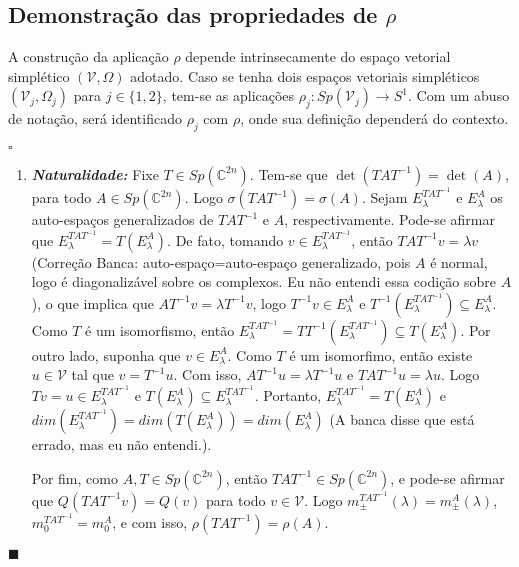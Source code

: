 \documentclass[12pt]{book}
\newenvironment{prova}[1]{$\square$ #1}{\hfill$\blacksquare$}
\newcommand{\autoespaco}[1]{E_{#1}}
\newcommand{\circulo}{S^{1}}
\newcommand{\complexificado}[1]{\mathcal{#1}}
\newcommand{\complexo}[1]{\mathbb{C}^{#1}}
\newcommand{\espectrooperador}[1]{\sigma(#1)}
\newcommand{\gruposimpletico}[1]{Sp(#1)}
\newcommand{\alerta}[1]{{\color{red}#1}}
\newcommand{\correcaobanca}[1]{\alerta{(Correção Banca: #1)}}
\begin{document}
	\subsection*{Demonstração das propriedades de $\rho$}
	
	A construção da aplicação $\rho$ depende intrinsecamente do espaço vetorial simplético $(\complexificado{V}, \Omega)$ adotado. Caso se tenha dois espaços vetoriais simpléticos $(\complexificado{V}_{j}, \Omega_{j})$ para $j\in \{1,2\}$, tem-se as aplicações $\rho_{j}:\gruposimpletico{\complexificado{V}_{j}} \to \circulo$. Com um abuso de notação, será identificado $\rho_{j}$ com $\rho$, onde sua definição dependerá do contexto.
	
	\begin{prova}
		
		\begin{enumerate}
			\item \textbf{\textit{Naturalidade:}} Fixe $T \in \gruposimpletico{\complexo{2n}}$.  Tem-se que $\det(TAT^{-1}) = \det(A)$, para todo $A \in \gruposimpletico{\complexo{2n}}$. Logo $\espectrooperador{TAT^{-1}} = \espectrooperador{A}$. Sejam $\autoespaco{\lambda}^{TAT^{-1}}$ e $\autoespaco{\lambda}^{A}$ os auto-espaços generalizados de $TAT^{-1}$ e $A$, respectivamente. Pode-se afirmar que $\autoespaco{\lambda}^{TAT^{-1}} = T(\autoespaco{\lambda}^{A})$. De fato, tomando $v \in \autoespaco{\lambda}^{TAT^{-1}}$, então $TAT^{-1}v = \lambda v$ \correcaobanca{auto-espaço=auto-espaço generalizado, pois $A$ é normal, logo é diagonalizável sobre os complexos. Eu não entendi essa codição sobre $A$}, o que implica que $AT^{-1}v = \lambda T^{-1}v$, logo $T^{-1}v \in \autoespaco{\lambda}^{A}$ e $T^{-1}(\autoespaco{\lambda}^{TAT^{-1}}) \subseteq \autoespaco{\lambda}^{A}$. \alerta{Como $T$ é um isomorfismo, então $\autoespaco{\lambda}^{TAT^{-1}} = TT^{-1}(\autoespaco{\lambda}^{TAT^{-1}}) \subseteq T(\autoespaco{\lambda}^{A})$. Por outro lado, suponha que $v\in \autoespaco{\lambda}^{A}$. Como $T$ é um isomorfimo, então existe $u \in \complexificado{V}$ tal que $v=T^{-1}u$. Com isso, $AT^{-1}u = \lambda T^{-1}u$ e $ TAT^{-1}u =\lambda u$. Logo $Tv=u \in \autoespaco{\lambda}^{TAT^{-1}}$ e $T(\autoespaco{\lambda}^{A}) \subseteq \autoespaco{\lambda}^{TAT^{-1}}$. Portanto, $\autoespaco{\lambda}^{TAT^{-1}}=T(\autoespaco{\lambda}^{A}) $ e $dim(\autoespaco{\lambda}^{TAT^{-1}})=dim(T(\autoespaco{\lambda}^{A}) )=dim(\autoespaco{\lambda}^{A})$ (A banca disse que está errado, mas eu não entendi.).} 
			
			Por fim, como $A,T\in \gruposimpletico{\complexo{2n}}$, então $TAT^{-1}\in \gruposimpletico{\complexo{2n}}$, e pode-se afirmar que $Q(TAT^{-1}v) = Q(v)$ para todo $v \in \complexificado{V}$. Logo  $m^{TAT^{-1}}_{\pm}(\lambda)=m^{A}_{\pm}(\lambda)$, $m_{0}^{TAT^{-1}}=m_{0}^{A}$, e com isso, $\rho(TAT^{-1})=\rho(A)$.
			

\end{enumerate}
\end{prova}
\end{document}
